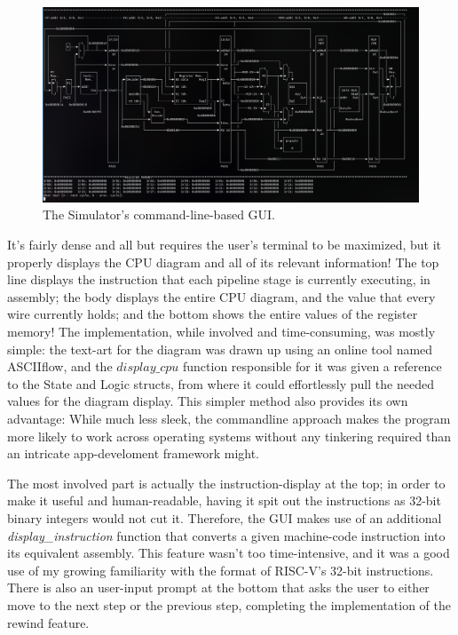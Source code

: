 \documentclass[12pt,twoside]{reedthesis}
\begin{document}
\begin{figure}[h!]

	\centering
	\includegraphics[scale=0.35]{simulator_screenshot}
	\caption{The Simulator's command-line-based GUI.}
	\label{simulator}
\end{figure}

\break

It's fairly dense and all but requires the user's terminal to be maximized, but it properly displays the CPU diagram and all of its relevant information! The top line displays the instruction that each pipeline stage is currently executing, in assembly; the body displays the entire CPU diagram, and the value that every wire currently holds; and the bottom shows the entire values of the register memory!
The implementation, while involved and time-consuming, was mostly simple: the text-art for the diagram was drawn up using an online tool named ASCIIflow, and the $display\_cpu$ function responsible for it was given a reference to the State and Logic structs, from where it could effortlessly pull the needed values for the diagram display. This simpler method also provides its own advantage: While much less sleek, the commandline approach makes the program more likely to work across operating systems without any tinkering required than an intricate app-develoment framework might.

The most involved part is actually the instruction-display at the top; in order to make it useful and human-readable, having it spit out the instructions as 32-bit binary integers would not cut it. Therefore, the GUI makes use of an additional \textit{display\_instruction} function that converts a given machine-code instruction into its equivalent assembly. This feature wasn't too time-intensive, and it was a good use of my growing familiarity with the format of RISC-V's 32-bit instructions.
There is also an user-input prompt at the bottom that asks the user to either move to the next step or the previous step, completing the implementation of the rewind feature.
\end{document}
